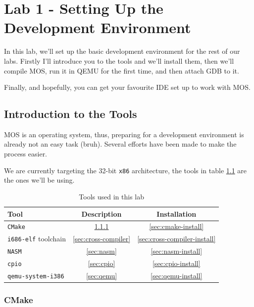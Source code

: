 \chapter{Lab 1 - Setting Up the Development Environment}

In this lab, we'll set up the basic development environment for the rest of our labs. Firstly
I'll introduce you to the tools and we'll install them, then we'll compile MOS, run it in QEMU
for the first time, and then attach GDB to it.

Finally, and hopefully, you can get your favourite IDE set up to work with MOS.

\section{Introduction to the Tools}

MOS is an operating system, thus, preparing for a development environment is already not
an easy task (bruh). Several efforts have been made to make the process easier.

We are currently targeting the 32-bit \texttt{x86} architecture, the tools in table \ref{tab:tools}
are the ones we'll be using.

\begin{table}[h!]
    \centering
    \begin{tabular}{|l|c|c|}
        \hline \textbf{Tool}               & \textbf{Description}     & \textbf{Installation}            \\
        \hline \texttt{CMake}              & \ref{sec:cmake}          & \ref{sec:cmake-install}          \\
        \hline \texttt{i686-elf} toolchain & \ref{sec:cross-compiler} & \ref{sec:cross-compiler-install} \\
        \hline \texttt{NASM}               & \ref{sec:nasm}           & \ref{sec:nasm-install}           \\
        \hline \texttt{cpio}               & \ref{sec:cpio}           & \ref{sec:cpio-install}           \\
        \hline \texttt{qemu-system-i386}   & \ref{sec:qemu}           & \ref{sec:qemu-install}           \\
        \hline
    \end{tabular}
    \caption{Tools used in this lab}
    \label{tab:tools}
\end{table}

\subsection{CMake} \label{sec:cmake}

